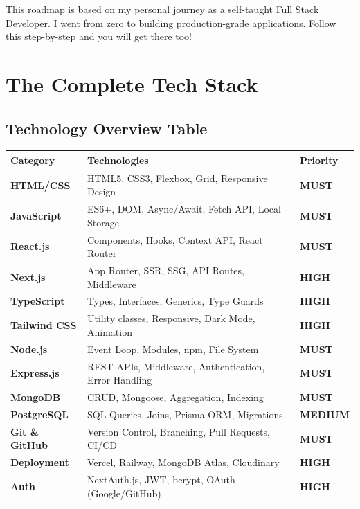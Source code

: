 \documentclass[12pt,a4paper]{article}
\begin{document}
\begin{tipbox}
This roadmap is based on my personal journey as a self-taught Full Stack Developer. I went from zero to building production-grade applications. Follow this step-by-step and you will get there too!
\end{tipbox}

\newpage

\section{The Complete Tech Stack}

\subsection{Technology Overview Table}

\begin{center}
\begin{tabularx}{\textwidth}{|>{\bfseries\color{FaranBlue}}l|X|>{\color{FaranAccent}\centering\arraybackslash}p{2.5cm}|}
\hline
\rowcolor{FaranDark}
\color{white}\textbf{Category} & \color{white}\textbf{Technologies} & \color{white}\textbf{Priority} \\
\hline
\rowcolor{FaranLight}
HTML/CSS & HTML5, CSS3, Flexbox, Grid, Responsive Design & \textbf{MUST} \\
\hline
JavaScript & ES6+, DOM, Async/Await, Fetch API, Local Storage & \textbf{MUST} \\
\hline
\rowcolor{FaranLight}
React.js & Components, Hooks, Context API, React Router & \textbf{MUST} \\
\hline
Next.js & App Router, SSR, SSG, API Routes, Middleware & \textbf{HIGH} \\
\hline
\rowcolor{FaranLight}
TypeScript & Types, Interfaces, Generics, Type Guards & \textbf{HIGH} \\
\hline
Tailwind CSS & Utility classes, Responsive, Dark Mode, Animation & \textbf{HIGH} \\
\hline
\rowcolor{FaranLight}
Node.js & Event Loop, Modules, npm, File System & \textbf{MUST} \\
\hline
Express.js & REST APIs, Middleware, Authentication, Error Handling & \textbf{MUST} \\
\hline
\rowcolor{FaranLight}
MongoDB & CRUD, Mongoose, Aggregation, Indexing & \textbf{MUST} \\
\hline
PostgreSQL & SQL Queries, Joins, Prisma ORM, Migrations & \textbf{MEDIUM} \\
\hline
\rowcolor{FaranLight}
Git \& GitHub & Version Control, Branching, Pull Requests, CI/CD & \textbf{MUST} \\
\hline
Deployment & Vercel, Railway, MongoDB Atlas, Cloudinary & \textbf{HIGH} \\
\hline
\rowcolor{FaranLight}
Auth & NextAuth.js, JWT, bcrypt, OAuth (Google/GitHub) & \textbf{HIGH} \\
\hline
\end{tabularx}
\end{center}
\end{document}
